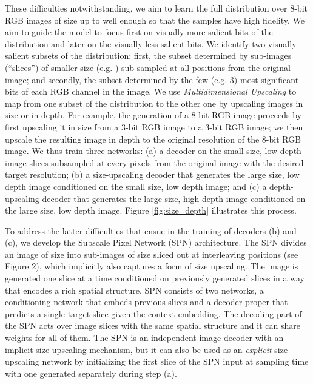 \documentclass{article} \usepackage{iclr2019_conference,times}
\begin{document}
These difficulties notwithstanding, we aim to learn the full distribution over 8-bit RGB images of size up to  well enough so that the samples have high fidelity. We aim to guide the model to focus first on visually more salient bits of the distribution and later on the visually less salient bits. We identify two visually salient subsets of the distribution: first, the subset determined by sub-images (``slices'') of smaller size (e.g. ) sub-sampled at all positions from the original image; and secondly, the subset determined by the few (e.g. 3) most significant bits of each RGB channel in the image. 
We use \emph{Multidimensional Upscaling} to map from one subset of the distribution to the other one by upscaling images in size or in depth. For example, the generation of a  8-bit RGB image proceeds by first upscaling it in size from a  3-bit RGB image to a  3-bit RGB image; we then upscale the resulting image in depth to the original resolution of the  8-bit RGB image. We thus train three networks: (a) a decoder on the small size, low depth image slices subsampled at every  pixels from the original image with the desired target resolution; (b) a size-upscaling decoder that generates the large size, low depth image conditioned on the small size, low depth image; and (c) a depth-upscaling decoder that generates the large size, high depth image conditioned on the large size, low depth image.  Figure \ref{fig:size_depth} illustrates this process.

To address the latter difficulties that ensue in the training of decoders (b) and (c), we develop the Subscale Pixel Network (SPN) architecture. The SPN divides an image of size  into sub-images of size  sliced out at interleaving positions (see Figure 2), which implicitly also captures a form of size upscaling. The  image is generated one slice at a time conditioned on previously generated slices in a way that encodes a rich spatial structure. SPN consists of two networks, a conditioning network that embeds previous slices and a decoder proper that predicts a single target slice given the context embedding. The decoding part of the SPN acts over image slices with the same spatial structure and it can share weights for all of them. The SPN is an independent image decoder with an implicit size upscaling mechanism, but it can also be used as an \emph{explicit} size upscaling network by initializing the first slice of the SPN input at sampling time with one generated separately during step (a). 
\end{document}
